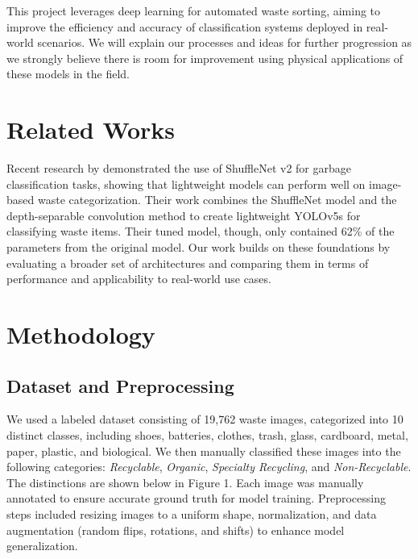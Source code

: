 \documentclass[11pt,twocolumn]{article}
\begin{document}
This project leverages deep learning for automated waste sorting, aiming to improve the efficiency and accuracy of classification systems deployed in real-world scenarios. We will explain our processes and ideas for further progression as we strongly believe there is room for improvement using physical applications of these models in the field. 

\section{Related Works}
\label{sec:background}
Recent research by \cite{chen2023} demonstrated the use of ShuffleNet v2 for garbage classification tasks, showing that lightweight models can perform well on image-based waste categorization. Their work combines the ShuffleNet model and the depth-separable convolution method to create lightweight YOLOv5s for classifying waste items. Their tuned model, though, only contained 62\% of the parameters from the original model. Our work builds on these foundations by evaluating a broader set of architectures and comparing them in terms of performance and applicability to real-world use cases.


\section{Methodology}
\label{sec:methodology}

\subsection{Dataset and Preprocessing}
We used a labeled dataset consisting of 19,762 waste images, categorized into 10 distinct classes, including shoes, batteries, clothes, trash, glass, cardboard, metal, paper, plastic, and biological. We then manually classified these images into the following categories: \textit{Recyclable}, \textit{Organic}, \textit{Specialty Recycling}, and \textit{Non-Recyclable}. The distinctions are shown below in Figure 1. Each image was manually annotated to ensure accurate ground truth for model training. Preprocessing steps included resizing images to a uniform shape, normalization, and data augmentation (random flips, rotations, and shifts) to enhance model generalization.
\end{document}
